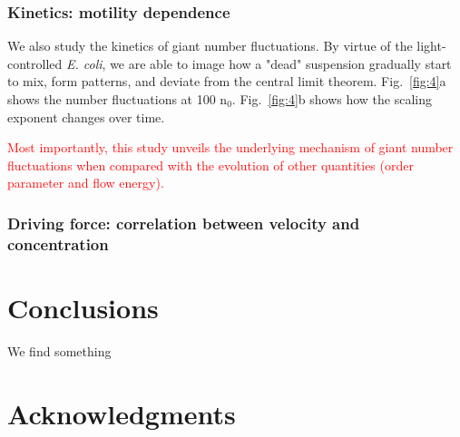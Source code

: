 \documentclass[twocolumn,aps,pre,amsmath,amssymb,floatfix,longbibliography]{revtex4-1}
\begin{document}
\subsubsection{Kinetics: motility dependence}
We also study the kinetics of giant number fluctuations. By virtue of the light-controlled \textit{E. coli}, we are able to image how a "dead" suspension gradually start to mix, form patterns, and deviate from the central limit theorem. Fig.~\ref{fig:4}a shows the number fluctuations at 100 n$_0$. Fig.~\ref{fig:4}b shows how the scaling exponent changes over time.

\textcolor{red}{Most importantly, this study unveils the underlying mechanism of giant number fluctuations when compared with the evolution of other quantities (order parameter and flow energy).}

\subsubsection{Driving force: correlation between velocity and concentration}
\section{Conclusions}
We find something

\section*{Acknowledgments}


%

\end{document}
